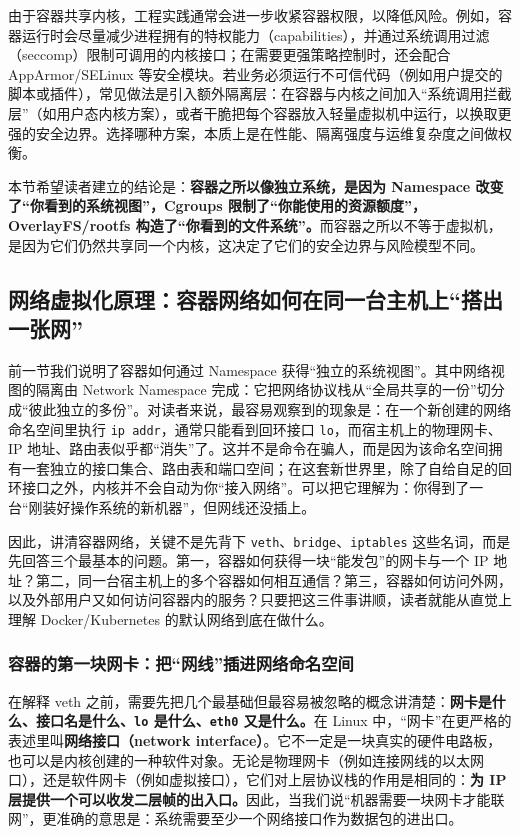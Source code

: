 由于容器共享内核，工程实践通常会进一步收紧容器权限，以降低风险。例如，容器运行时会尽量减少进程拥有的特权能力（capabilities），并通过系统调用过滤（seccomp）限制可调用的内核接口；在需要更强策略控制时，还会配合 AppArmor/SELinux 等安全模块。若业务必须运行不可信代码（例如用户提交的脚本或插件），常见做法是引入额外隔离层：在容器与内核之间加入“系统调用拦截层”（如用户态内核方案），或者干脆把每个容器放入轻量虚拟机中运行，以换取更强的安全边界。选择哪种方案，本质上是在性能、隔离强度与运维复杂度之间做权衡。

本节希望读者建立的结论是：\textbf{容器之所以像独立系统，是因为 Namespace 改变了“你看到的系统视图”，Cgroups 限制了“你能使用的资源额度”，OverlayFS/rootfs 构造了“你看到的文件系统”。}而容器之所以不等于虚拟机，是因为它们仍然共享同一个内核，这决定了它们的安全边界与风险模型不同。


\subsection{网络虚拟化原理：容器网络如何在同一台主机上“搭出一张网”}

前一节我们说明了容器如何通过 Namespace 获得“独立的系统视图”。其中网络视图的隔离由 Network Namespace 完成：它把网络协议栈从“全局共享的一份”切分成“彼此独立的多份”。对读者来说，最容易观察到的现象是：在一个新创建的网络命名空间里执行 \texttt{ip addr}，通常只能看到回环接口 \texttt{lo}，而宿主机上的物理网卡、IP 地址、路由表似乎都“消失”了。这并不是命令在骗人，而是因为该命名空间拥有一套独立的接口集合、路由表和端口空间；在这套新世界里，除了自给自足的回环接口之外，内核并不会自动为你“接入网络”。可以把它理解为：你得到了一台“刚装好操作系统的新机器”，但网线还没插上。 %

因此，讲清容器网络，关键不是先背下 \texttt{veth}、\texttt{bridge}、\texttt{iptables} 这些名词，而是先回答三个最基本的问题。第一，容器如何获得一块“能发包”的网卡与一个 IP 地址？第二，同一台宿主机上的多个容器如何相互通信？第三，容器如何访问外网，以及外部用户又如何访问容器内的服务？只要把这三件事讲顺，读者就能从直觉上理解 Docker/Kubernetes 的默认网络到底在做什么。

\subsubsection{容器的第一块网卡：把“网线”插进网络命名空间}

在解释 veth 之前，需要先把几个最基础但最容易被忽略的概念讲清楚：\textbf{网卡是什么、接口名是什么、\texttt{lo} 是什么、\texttt{eth0} 又是什么。}在 Linux 中，“网卡”在更严格的表述里叫\textbf{网络接口（network interface）}。它不一定是一块真实的硬件电路板，也可以是内核创建的一种软件对象。无论是物理网卡（例如连接网线的以太网口），还是软件网卡（例如虚拟接口），它们对上层协议栈的作用是相同的：\textbf{为 IP 层提供一个可以收发二层帧的出入口。}因此，当我们说“机器需要一块网卡才能联网”，更准确的意思是：系统需要至少一个网络接口作为数据包的进出口。

